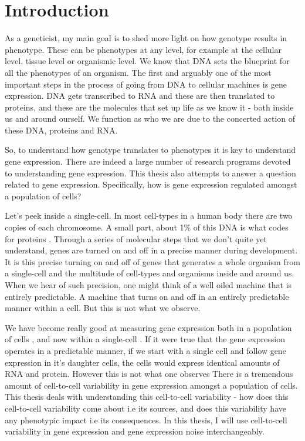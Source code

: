 \chapter{Introduction}
\label{chap:introduction}
\tightlists

As a geneticist, my main goal is to shed more light on how genotype results in phenotype. These can be phenotypes at any level, for example at the cellular level, tissue level or organismic level. We know that DNA sets the blueprint for all the phenotypes of an organism. The first and arguably one of the most important steps in the process of going from DNA to cellular machines is gene expression. DNA gets transcribed to RNA and these are then translated to proteins, and these are the molecules that set up life as we know it - both inside us and around ourself. We function as who we are due to the concerted action of these DNA, proteins and RNA.

So, to understand how genotype translates to phenotypes it is key to understand gene expression. There are indeed a large number of research programs devoted to understanding gene expression. This thesis also attempts to answer a question related to gene expression. Specifically, how is gene expression regulated amongst a population of cells?

Let's peek inside a single-cell. In most cell-types in a human body there are two copies of each chromosome. A small part, about 1\% of this DNA is what codes for proteins \cite {human genome}. Through a series of molecular steps that we don't quite yet understand, genes are turned on and off in a precise manner during development. It is this precise turning on and off of genes that generates a whole organism from a single-cell and the multitude of cell-types and organisms inside and around us. When we hear of such precision, one might think of a well oiled machine that is entirely predictable. A machine that turns on and off in an entirely predictable manner within a cell. But this is not what we observe.

We have become really good at measuring gene expression both in a population of cells \cite{bulk rnaseq, }, and now within a single-cell \cite{single-cell, flow cityu, smFish}. If it were true that the gene expression operates in a predictable manner, if we start with a single cell and follow gene expression in it's daughter cells, the cells would express identical amounts of RNA and protein. However this is not what one observes \cite{elowitz} There is a tremendous amount of cell-to-cell variability in gene expression amongst a population of cells. This thesis deals with understanding this cell-to-cell variability - how does this cell-to-cell variability come about i.e its sources, and does this variability have any phenotypic impact i.e its consequences. In this thesis, I will use cell-to-cell variability in gene expression and gene expression noise interchangeably.

